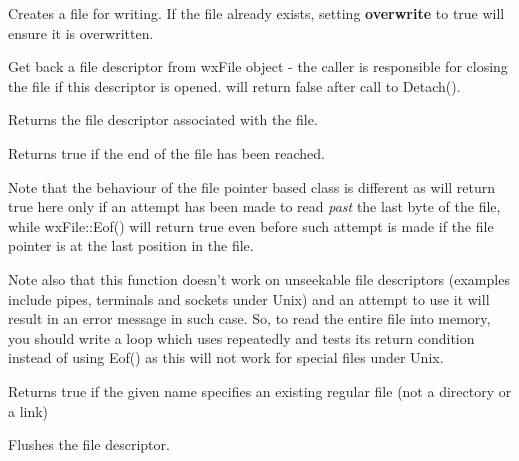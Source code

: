 
Creates a file for writing. If the file already exists, setting {\bf overwrite} to true
will ensure it is overwritten.


\label{wxfiledetach}


Get back a file descriptor from wxFile object - the caller is responsible for closing the file if this
descriptor is opened.  will return false after call to Detach().


\label{wxfilefd}


Returns the file descriptor associated with the file.


\label{wxfileeof}


Returns true if the end of the file has been reached.

Note that the behaviour of the file pointer based class 
 is different as  
will return true here only if an attempt has been made to read 
{\it past} the last byte of the file, while wxFile::Eof() will return true
even before such attempt is made if the file pointer is at the last position
in the file.

Note also that this function doesn't work on unseekable file descriptors
(examples include pipes, terminals and sockets under Unix) and an attempt to
use it will result in an error message in such case. So, to read the entire
file into memory, you should write a loop which uses 
 repeatedly and tests its return condition instead
of using Eof() as this will not work for special files under Unix.


\label{wxfileexists}


Returns true if the given name specifies an existing regular file (not a
directory or a link)


\label{wxfileflush}


Flushes the file descriptor.


